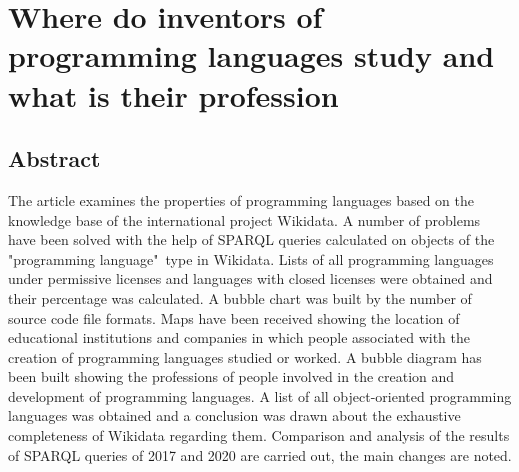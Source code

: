 \setchapterpreamble[u]{\margintoc}
\chapter{Where do inventors of programming languages study and what is their profession}

\section{Abstract}
The article examines the properties of programming languages based on the knowledge base of the international project Wikidata. A number of problems have been solved with the help of SPARQL queries calculated on objects of the "programming language"\  type in Wikidata. Lists of all programming languages under permissive licenses and languages with closed licenses were obtained and their percentage was calculated. A bubble chart was built by the number of source code file formats. Maps have been received showing the location of educational institutions and companies in which people associated with the creation of programming languages studied or worked. A bubble diagram has been built showing the professions of people involved in the creation and development of programming languages. A list of all object-oriented programming languages was obtained and a conclusion was drawn about the exhaustive completeness of Wikidata regarding them. Comparison and analysis of the results of SPARQL queries of 2017 and 2020 are carried out, the main changes are noted.

